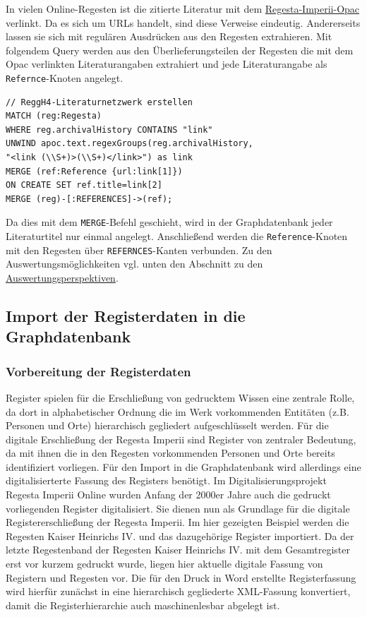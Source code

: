 \documentclass[12pt,ngerman,]{article}
\begin{document}
In vielen Online-Regesten ist die zitierte Literatur mit dem
\href{http://opac.regesta-imperii.de/lang_de/}{Regesta-Imperii-Opac}
verlinkt. Da es sich um URLs handelt, sind diese Verweise eindeutig.
Andererseits lassen sie sich mit regulären Ausdrücken aus den Regesten
extrahieren. Mit folgendem Query werden aus den Überlieferungsteilen der
Regesten die mit dem Opac verlinkten Literaturangaben extrahiert und
jede Literaturangabe als \texttt{Refernce}-Knoten angelegt.

\begin{verbatim}
// ReggH4-Literaturnetzwerk erstellen
MATCH (reg:Regesta)
WHERE reg.archivalHistory CONTAINS "link"
UNWIND apoc.text.regexGroups(reg.archivalHistory,
"<link (\\S+)>(\\S+)</link>") as link
MERGE (ref:Reference {url:link[1]})
ON CREATE SET ref.title=link[2]
MERGE (reg)-[:REFERENCES]->(ref);
\end{verbatim}

Da dies mit dem \texttt{MERGE}-Befehl geschieht, wird in der
Graphdatenbank jeder Literaturtitel nur einmal angelegt. Anschließend
werden die \texttt{Reference}-Knoten mit den Regesten über
\texttt{REFERNCES}-Kanten verbunden. Zu den Auswertungsmöglichkeiten
vgl. unten den Abschnitt zu den
\protect\hyperlink{ux5cux23Auswertungsperspektiven}{Auswertungsperspektiven}.

\subsection{Import der Registerdaten in die
Graphdatenbank}\label{import-der-registerdaten-in-die-graphdatenbank}

\subsubsection{Vorbereitung der
Registerdaten}\label{vorbereitung-der-registerdaten}

Register spielen für die Erschließung von gedrucktem Wissen eine
zentrale Rolle, da dort in alphabetischer Ordnung die im Werk
vorkommenden Entitäten (z.B. Personen und Orte) hierarchisch gegliedert
aufgeschlüsselt werden. Für die digitale Erschließung der Regesta
Imperii sind Register von zentraler Bedeutung, da mit ihnen die in den
Regesten vorkommenden Personen und Orte bereits identifiziert vorliegen.
Für den Import in die Graphdatenbank wird allerdings eine
digitalisierterte Fassung des Registers benötigt. Im
Digitalisierungsprojekt Regesta Imperii Online wurden Anfang der 2000er
Jahre auch die gedruckt vorliegenden Register digitalisiert. Sie dienen
nun als Grundlage für die digitale Registererschließung der Regesta
Imperii. Im hier gezeigten Beispiel werden die Regesten Kaiser Heinrichs
IV. und das dazugehörige Register importiert. Da der letzte Regestenband
der Regesten Kaiser Heinrichs IV. mit dem Gesamtregister erst vor kurzem
gedruckt wurde, liegen hier aktuelle digitale Fassung von Registern und
Regesten vor. Die für den Druck in Word erstellte Registerfassung wird
hierfür zunächst in eine hierarchisch gegliederte XML-Fassung
konvertiert, damit die Registerhierarchie auch maschinenlesbar abgelegt
ist.
\end{document}
